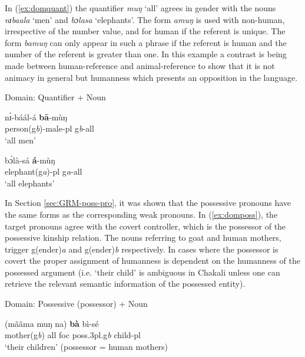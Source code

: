 \begin{exe}
\begin{exe}
\begin{exe}
{\begin{exe}
\begin{exe}
\begin{exe}
\begin{exe}
\begin{exe}
\begin{exe}
\begin{exe}
\begin{xlist}
\begin{exe}
\begin{exe}
\begin{exe}
\begin{exe}
\begin{exe}
\begin{exe}
\begin{exe}
\begin{exe}
\begin{exe}
\begin{exe}
\begin{exe}
\begin{exe}
\begin{exe}
In (\ref{ex:domquant}) the quantifier {\it muŋ} `all'
agrees in gender with the nouns {\it nɪbaala} `men' and
{\it bɔlasa} `elephants'.  The form {\it amuŋ} is
used with non-human, irrespective of the number value, and for human if
the referent is unique. The form  {\it bamuŋ} can only  appear in such a phrase
if the referent is human and the number of the referent is greater than one. In
this example a contrast is being made between
human-reference and animal-reference to show that it is not animacy in general 
but
humanness
which presents an opposition in the language.


\ea\label{ex:domquant}{\rm Domain: Quantifier + Noun}\\


\ea\label{ex:domquantH+}

\gll   nɪ̀-báál-á     \textbf{bā}-mùŋ \\
       {person({\sc g}{\it b})-male-{\sc pl}} {\sc g}{\it b}-{\sc all} \\
\glt `all men' \\

\ex\label{ex:domquantH-}

\gll   bɔ̀là-sá  \textbf{á}-mùŋ\\
        {elephant({\sc g}{\it a})-{\sc pl}}  {\sc g}{\it a}-{\sc all}\\
\glt `all elephants' \\


\z 
 \z

In Section \ref{secːGRM-poss-pro}, it was shown   that the possessive pronouns
have the same forms as
the corresponding weak
pronouns.  In
(\ref{ex:domposs}),  the target pronouns agree with the covert
controller, which is the possessor of the possessive kinship relation.
The nouns referring to goat and human mothers, trigger
{\sc g(ender)}{\it a} and {\sc g(ender)}{\it b} respectively. In cases where 
the possessor is covert the proper
assignment of humanness is dependent on the humanness of the possessed
argument (i.e. `their child' is ambiguous in Chakali unless one can 
retrieve the relevant semantic  information of the possessed entity).

\ea\label{ex:domposs}{\rm Domain: Possessive (possessor) + Noun}\\


\ea\label{ex:dompossH+}

\gll (mããma muŋ na)   \textbf{bà}   bì-sé\\
       mother({\sc g}{\it b}) all {\sc foc}  {\sc poss.3pl.g}{\it b}
{child-{\sc pl}} \\
\glt `their children' (possessor = human mothers) 


\end{exe}
\end{exe}
\end{exe}
\end{exe}
\end{exe}
\end{exe}
\end{exe}
\end{exe}
\end{exe}
\end{exe}
\end{exe}
\end{exe}
\end{exe}
\end{xlist}
\end{exe}
\end{exe}
\end{exe}
\end{exe}
\end{exe}
\end{exe}
\end{exe}}
\end{exe}
\end{exe}
\end{exe}
